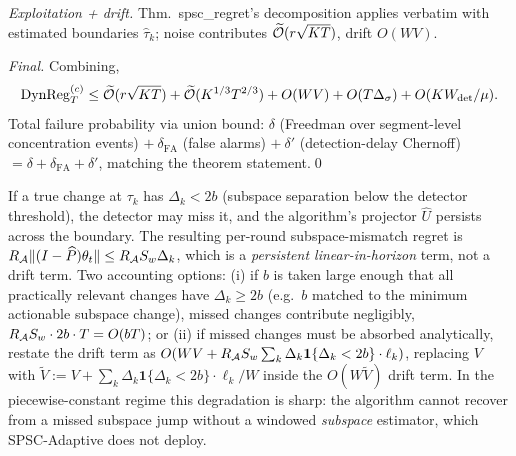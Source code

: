 \emph{Exploitation + drift.} Thm.\ spsc\_regret's decomposition
applies verbatim with estimated boundaries $\widehat\tau_k$; noise
contributes $\widetilde{\mathcal{O}}(r\sqrt{KT})$, drift $O(WV)$.

\emph{Final.} Combining,
\[
\mathrm{DynReg}_T^{(c)}\le\widetilde{\mathcal{O}}(r\sqrt{KT})+\widetilde{\mathcal{O}}(K^{1/3}T^{2/3})+O(WV)+O(T\Delta_\sigma)+O(KW_{\mathrm{det}}/\mu).
\]
Total failure probability via union bound: $\delta$ (Freedman over
segment-level concentration events) $+\ \delta_{\mathrm{FA}}$ (false
alarms) $+\ \delta'$ (detection-delay Chernoff) $=\delta+\delta_{\mathrm{FA}}+\delta'$,
matching the theorem statement.\qed

\begin{remark}
\label{rem:small_change}
If a true change at $\tau_k$ has $\Delta_k<2b$ (subspace separation
below the detector threshold), the detector may miss it, and the
algorithm's projector $\widehat U$ persists across the boundary. The
resulting per-round subspace-mismatch regret is
$R_{\mathcal{A}}\|(I-\widehat P)\theta_t\|\le R_{\mathcal{A}} S_w\Delta_k$, which is a
\emph{persistent linear-in-horizon} term, not a drift term. Two
accounting options: (i) if $b$ is taken large enough that all
practically relevant changes have $\Delta_k\ge 2b$ (e.g.\ $b$ matched
to the minimum actionable subspace change), missed changes
contribute negligibly, $R_{\mathcal{A}} S_w\cdot 2b\cdot T = O(bT)$; or (ii) if
missed changes must be absorbed analytically, restate the drift term
as $O(WV+R_{\mathcal{A}} S_w\sum_k\Delta_k\mathbf 1\{\Delta_k<2b\}\cdot\ell_k)$,
replacing $V$ with
$\widetilde V := V+\sum_k\Delta_k\mathbf 1\{\Delta_k<2b\}\cdot\ell_k/W$
inside the $O(W\widetilde V)$ drift term. In the piecewise-constant
regime this degradation is sharp: the algorithm cannot recover from a
missed subspace jump without a windowed \emph{subspace} estimator,
which SPSC-Adaptive does not deploy.
\end{remark}


